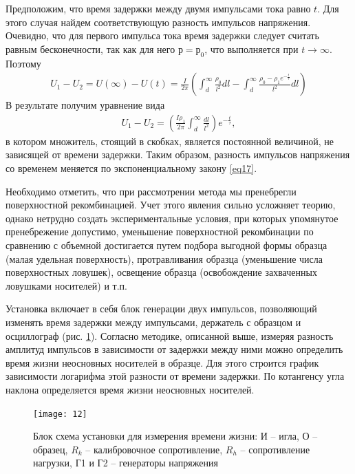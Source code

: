 \documentclass[a4paper,14pt]{extarticle}
\begin{document}
Предположим, что время задержки между двумя импульсами тока равно $t$. Для этого случая найдем соответствующую разность импульсов напряжения. Очевидно, что для первого импульса тока время задержки следует считать равным бесконечности, так как для него $р = р_0$, что выполняется при $t\to\infty$. Поэтому
\begin{gather}
	\label{eq21}
	U_{1}-U_{2}=U(\infty)-U(t)=\frac{I}{2 \pi}\left(\int_{d}^{\infty} \frac{\rho_{0}}{l^{2}} d l-\int_{d}^{\infty} \frac{\rho_{0}-\rho_{1} e^{-\frac{t}{\tau}}}{l^{2}} d l\right)
\end{gather}
В результате получим уравнение вида
\begin{gather}
 	\label{eq22}
 	U_{1}-U_{2}=\left(\frac{I \rho_{1}}{2 \pi} \int_{d}^{\infty} \frac{d l}{l^{2}}\right) e^{-\frac{t}{\tau}},
 \end{gather}
 в котором множитель, стоящий в скобках, является постоянной величиной, не зависящей от времени задержки. Таким образом, разность импульсов напряжения со временем меняется по экспоненциальному закону \eqref{eq17}.

Необходимо отметить, что при рассмотрении метода мы пренебрегли поверхностной рекомбинацией. Учет этого явления сильно усложняет теорию, однако нетрудно создать экспериментальные условия, при которых упомянутое пренебрежение допустимо, уменьшение поверхностной рекомбинации по сравнению с объемной достигается путем подбора выгодной формы образца (малая удельная поверхность), протравливания образца (уменьшение числа поверхностных ловушек), освещение образца (освобождение захваченных ловушками носителей) и т.п.

Установка включает в себя блок генерации двух импульсов, позволяющий изменять время задержки между импульсами, держатель с образцом и осциллограф (рис.  \ref{fig:figure11}). Согласно методике, описанной выше, измеряя разность амплитуд импульсов в зависимости от задержки между ними можно определить время жизни неосновных носителей в образце. Для этого строится график зависимости логарифма этой разности от времени задержки. По котангенсу угла наклона определяется время жизни неосновных носителей.
\begin{figure}[H]
	\centering
	\texttt{[image: 12]}
	\caption{Блок схема установки для измерения времени жизни:
И -- игла, О -- образец, $R_k$ -- калибровочное сопротивление, $R_h$ -- сопротивление нагрузки, Г1 и Г2 -- генераторы напряжения }
	\label{fig:figure11}
\end{figure}
\end{document}
